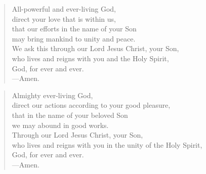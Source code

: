 \prayer

\setlength{\leftmargini}{\prayerleftmargini}

\begin{verse}
All-powerful and ever-living God,\\
direct your love that is within us,\\
that our efforts in the name of your Son\\
may bring mankind to unity and peace.\\
We ask this through our Lord Jesus Christ, your Son,\\
who lives and reigns with you and the Holy Spirit,\\
God, for ever and ever.\\
{\color{red}---\thinspace}Amen.
\end{verse}


\begin{verse}
Almighty ever-living God,\\
direct our actions according to your good pleasure,\\
that in the name of your beloved Son\\
we may abound in good works.\\
Through our Lord Jesus Christ, your Son,\\
who lives and reigns with you in the unity of the Holy Spirit,\\
God, for ever and ever.\\
{\color{red}---\thinspace}Amen.
\end{verse}

\setlength{\leftmargini}{\defleftmargini}